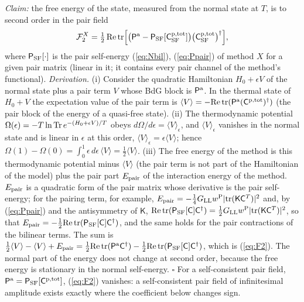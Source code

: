 \documentclass[aps,prd,onecolumn,superscriptaddress,nofootinbib,floatfix,longbibliography]{revtex4-2}
\newcommand{\LL}{{\rm LL}}
\newcommand{\SF}{{\rm SF}}
\newcommand{\tr}{\mathrm{tr}}
\begin{document}
\emph{Claim:} the free energy of the state, measured from the normal state at $T$, is to second order in the pair field
\begin{equation}
\mathcal F^X_2=\tfrac12\,{\rm Re}\,\tr\Big[\big(\mathsf P^{\rm a}-\mathsf P_\SF[\mathsf C^{\rm p,tot}_\SF]\big)\big(\mathsf C^{\rm p,tot}_\SF\big)^\dagger\Big],
\label{eq:F2}
\end{equation}
where $\mathsf P_\SF[\cdot]$ is the pair self-energy (\ref{eq:Nbil}), (\ref{eq:Ppair}) of method $X$ for a given pair matrix (linear in it; it
contains every pair channel of the method's functional). \emph{Derivation.} (i) Consider the quadratic Hamiltonian $H_0+\epsilon V$
of the normal state plus a pair term $V$ whose BdG block is $\mathsf P^{\rm a}$. In the thermal state of $H_0+V$ the expectation value of
the pair term is $\langle V\rangle=-{\rm Re}\,\tr(\mathsf P^{\rm a}(\mathsf C^{\rm p,tot})^\dagger)$ (the pair block of the energy of a quasi-free
state). (ii) The thermodynamic potential $\Omega(\epsilon)=-T\ln{\rm Tr}\,e^{-(H_0+\epsilon V)/T}$ obeys $d\Omega/d\epsilon=\langle V\rangle_\epsilon$, and
$\langle V\rangle_\epsilon$ vanishes in the normal state and is linear in $\epsilon$ at this order, $\langle V\rangle_\epsilon=\epsilon\langle V\rangle$; hence
$\Omega(1)-\Omega(0)=\int_0^1\epsilon\,d\epsilon\,\langle V\rangle=\frac12\langle V\rangle$. (iii) The free energy of the method is this thermodynamic
potential minus $\langle V\rangle$ (the pair term is not part of the Hamiltonian of the model) plus the pair part $E_{\rm pair}$ of the
interaction energy of the method. $E_{\rm pair}$ is a quadratic form of the pair matrix whose derivative is the pair self-energy; for the
pairing term, for example, $E_{\rm pair}=-\frac14G_\LL w^{\rm P}|\tr(\mathsf K\mathsf C^T)|^2$ and, by (\ref{eq:Ppair}) and the antisymmetry of
$\mathsf K$, ${\rm Re}\,\tr(\mathsf P_\SF[\mathsf C]\mathsf C^\dagger)=\frac12G_\LL w^{\rm P}|\tr(\mathsf K\mathsf C^T)|^2$, so that
$E_{\rm pair}=-\frac12{\rm Re}\,\tr(\mathsf P_\SF[\mathsf C]\mathsf C^\dagger)$, and the same holds for the pair contractions of the bilinear terms. The
sum is $\frac12\langle V\rangle-\langle V\rangle+E_{\rm pair}=\frac12{\rm Re}\,\tr(\mathsf P^{\rm a}\mathsf C^\dagger)-\frac12{\rm Re}\,\tr(\mathsf P_\SF[\mathsf C]\mathsf C^\dagger)$,
which is (\ref{eq:F2}). The normal part of the energy does not change at second order, because the free energy is stationary in
the normal self-energy. $\square$ For a self-consistent pair field, $\mathsf P^{\rm a}=\mathsf P_\SF[\mathsf C^{\rm p,tot}]$, (\ref{eq:F2})
vanishes: a self-consistent pair field of infinitesimal amplitude exists exactly where the coefficient below changes sign.
\end{document}
